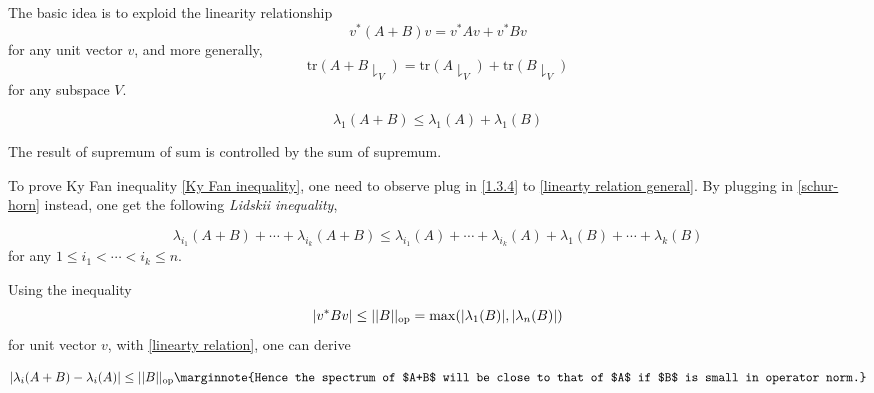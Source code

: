 The basic idea is to  exploid the linearity relationship
\begin{equation}\label{linearty relation}
    v^*(A+B)v = v^*Av+v^*Bv
\end{equation}
for any unit vector $v$, and more generally,
\begin{equation}\label{linearty relation general}
    \mathrm{tr}(A+B\downharpoonright_V) = \mathrm{tr}(A\downharpoonright_V)+\mathrm{tr}(B\downharpoonright_V)
\end{equation}
for any subspace $V$.

\begin{proposition}
    \begin{equation}
        \lambda_1(A+B) \leq \lambda_1(A)+\lambda_1(B)
    \end{equation}
\end{proposition}

The result of supremum of sum is controlled by the sum of supremum.

To prove Ky Fan inequality \ref{Ky Fan inequality}, one need to observe plug in \ref{1.3.4} to \ref{linearty relation general}. By plugging in \ref{schur-horn} instead, one get the following \textit{Lidskii inequality},

\begin{proposition}
    \label{Lidskii inequality}
    \begin{equation*}
        \lambda_{i_1} (A+B)+\cdots+\lambda_{i_k}(A+B) \leq \lambda_{i_1}(A)+\cdots+\lambda_{i_k}(A)+\lambda_{1}(B)+\cdots+\lambda_{k}(B)
    \end{equation*}
    for any $1\leq i_1 <\cdots<i_k\leq n$.
\end{proposition}

Using the inequality
\begin{equation*}
    |v^*Bv|\leq ||B||_{\rm{op}} =\max(|\lambda_1(B)|,|\lambda_n(B)|)
\end{equation*}
for unit vector $v$, with \ref{linearty relation}, one can derive

\begin{proposition}
    \label{Eigenvalue stability inequality}
    \begin{equation*}
        |\lambda_i(A+B)-\lambda_i(A)| \leq ||B||_{\mathrm{op}} \marginnote{Hence the spectrum of $A+B$ will be close to that of $A$ if $B$ is small in operator norm.}
    \end{equation*}
\end{proposition}

